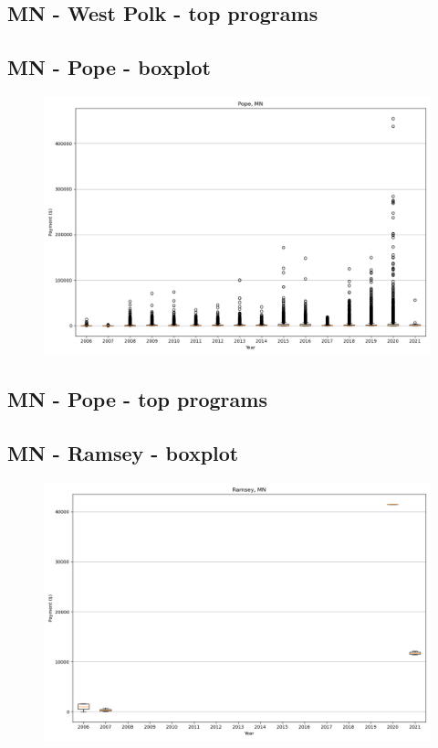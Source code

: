 \subsection*{MN - West Polk - top programs}

\newpage
\subsection*{MN - Pope - boxplot}
\begin{figure}[h]
\centering
\includegraphics[width=7in]{../output/boxplots/counties/Pope-MN_boxplot.png}
\end{figure}


\subsection*{MN - Pope - top programs}

\newpage
\subsection*{MN - Ramsey - boxplot}
\begin{figure}[h]
\centering
\includegraphics[width=7in]{../output/boxplots/counties/Ramsey-MN_boxplot.png}
\end{figure}


